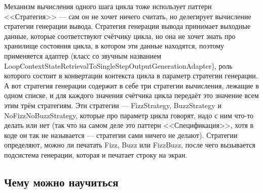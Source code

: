 \documentclass[a5paper]{article}
\begin{document}
Механизм вычисления одного шага цикла тоже использует паттерн <<Стратегия>> --- сам он не хочет ничего считать, но делегирует вычисление стратегии генерации вывода. Стратегия генерации вывода принимает выходные данные, которые соответствуют счётчику цикла, но она не хочет знать про хранилище состояния цикла, в котором эти данные находятся, поэтому применяется адаптер (класс со звучным названием LoopContextStateRetrievalToSingleStepOutputGenerationAdapter), роль которого состоит в конвертации контекста цикла в параметр стратегии генерации. А вот стратегия генерации содержит в себе три стратегии вычисления, лежащие в одном списке, и для каждого значения счётчика цикла передаёт это значение всем этим трём стратегиям. Эти стратегии --- FizzStrategy, BuzzStrategy и NoFizzNoBuzzStrategy, которые про параметр цикла говорят, надо с ним что-то делать или нет (так что на самом деле это паттерн <<Спецификация>>, хотя в коде он так не называется --- стратегии сами ничего не делают). Стратегии определяют, можно ли печатать Fizz, Buzz или FizzBuzz, после чего вызывается подсистема генерации, которая и печатает строку на экран.

\subsection{Чему можно научиться}
\end{document}
